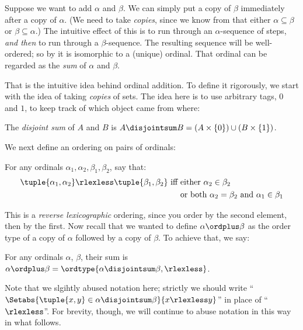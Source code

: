 \documentclass[../../../include/open-logic-section]{subfiles}
\begin{document}

Suppose we want to add $\alpha$ and $\beta$. We can simply put a
{copy} of $\beta$ immediately after a copy of $\alpha$. (We need to
take \emph{copies}, since we know from
 that either $\alpha
\subseteq \beta$ or $\beta \subseteq \alpha$.) The intuitive effect of
this is to run through an $\alpha$-sequence of steps, \emph{and then}
to run through a $\beta$-sequence. The resulting sequence will be
well-ordered; so by
 it is isomorphic
to a (unique) ordinal. That ordinal can be regarded as the \emph{sum}
of $\alpha$ and $\beta$. 

That is the intuitive idea behind ordinal addition. To define it
rigorously, we start with the idea of taking \emph{copies} of sets.
The idea here is to use arbitrary tags, $0$ and $1$, to keep track of
which object came from where:

\begin{defn}
The \emph{disjoint sum} of $A$ and $B$ is $A \disjointsum B = (A\times
\{0\}) \cup (B \times \{1\})$.
\end{defn}

We next define an ordering on pairs of ordinals:

\begin{defn}
For any ordinals $\alpha_1, \alpha_2, \beta_1, \beta_2$, say that:
\begin{align*}
	\tuple{\alpha_1, \alpha_2} \rlexless \tuple{\beta_1, \beta_2}\text{ iff }& 
	\text{either $\alpha_2 \in \beta_2$}\\
	& \text{or both $\alpha_2 = \beta_2$ and $\alpha_1 \in \beta_1$}
\end{align*} 
\end{defn}

This is a \emph{reverse lexicographic} ordering, since you order by
the second element, then by the first. Now recall that we wanted to
define $\alpha \ordplus \beta$ as the order type of a copy of $\alpha$
followed by a copy of $\beta$. To achieve that, we say:

\begin{defn}
For any ordinals $\alpha$, $\beta$, their sum is $\alpha \ordplus
\beta = \ordtype{\alpha \disjointsum \beta, \rlexless}$.
\end{defn}
\noindent
Note that we slgihtly abused notation here; strictly we should write ``$\Setabs{\tuple{x,y}\in \alpha\disjointsum\beta}{x \rlexless y}$'' in place of ``$\rlexless$''. For brevity, though, we will continue to abuse notation in this way in what follows. 
\end{document}
